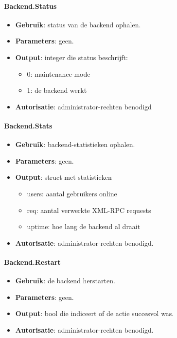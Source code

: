 \paragraph{Backend.Status}
\begin{itemize}
\item{\textbf{Gebruik}: status van de backend ophalen.}
\item{\textbf{Parameters}: geen.}
\item{\textbf{Output}: integer die status beschrijft:}
	\begin{itemize}
	\item{0: maintenance-mode}
	\item{1: de backend werkt}
	\end{itemize}
\item{\textbf{Autorisatie}: administrator-rechten benodigd}
\end{itemize}

\paragraph{Backend.Stats}
\begin{itemize}
\item{\textbf{Gebruik}: backend-statistieken ophalen.}
\item{\textbf{Parameters}: geen.}
\item{\textbf{Output}: struct met statistieken}
	\begin{itemize}
	\item{users: aantal gebruikers online}
	\item{req: aantal verwerkte XML-RPC requests}
	\item{uptime: hoe lang de backend al draait}
	\end{itemize}
\item{\textbf{Autorisatie}: administrator-rechten benodigd.}
\end{itemize}

\paragraph{Backend.Restart}
\begin{itemize}
\item{\textbf{Gebruik}: de backend herstarten.}
\item{\textbf{Parameters}: geen.}
\item{\textbf{Output}: bool die indiceert of de actie succesvol was.}
\item{\textbf{Autorisatie}: administrator-rechten benodigd.}
\end{itemize}

